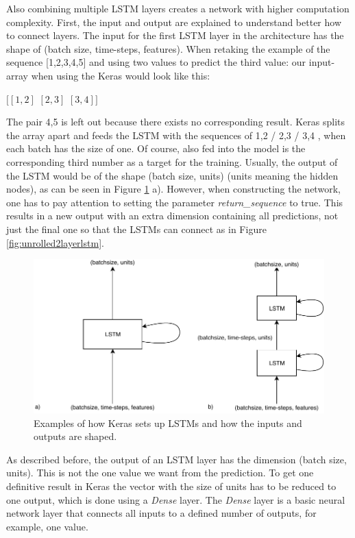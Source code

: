Also combining multiple LSTM layers creates a network with higher computation complexity.
First, the input and output are explained to understand better how to connect layers.
The input for the first LSTM layer in the architecture has the shape of (batch size, time-steps, features).
When retaking the example of the sequence [1,2,3,4,5] and using two values to predict the third value: our input-array when using the Keras would look like this:
\begin{displayquote}
	$[[1, 2]$\linebreak
	$ [2, 3]$\linebreak
	$ [3, 4]]$
\end{displayquote}
The pair 4,5 is left out because there exists no corresponding result.
Keras splits the array apart and feeds the LSTM with the sequences of 1,2 / 2,3 / 3,4 , when each batch has the size of one.
Of course, also fed into the model is the corresponding third number as a target for the training.
Usually, the output of the LSTM would be of the shape (batch size, units) (units meaning the hidden nodes), as can be seen in Figure \ref{fig:singlelstmkeras} a).
However, when constructing the network, one has to pay attention to setting the parameter \textit{return\_sequence} to true.
This results in a new output with an extra dimension containing all predictions, not just the final one so that the LSTMs can connect as in Figure \ref{fig:unrolled2layerlstm}.            
\begin{figure}
	\centering
	\includegraphics[width=0.7\linewidth]{Pictures/SingleLSTMKeras}
	\caption{Examples of how Keras sets up LSTMs and how the inputs and outputs are shaped.}
	\label{fig:singlelstmkeras}
\end{figure}

As described before, the output of an LSTM layer has the dimension (batch size, units).
This is not the one value we want from the prediction.
To get one definitive result in Keras the vector with the size of units has to be reduced to one output, which is done using a \textit{Dense} layer.
The \textit{Dense} layer is a basic neural network layer that connects all inputs to a defined number of outputs, for example, one value.            

